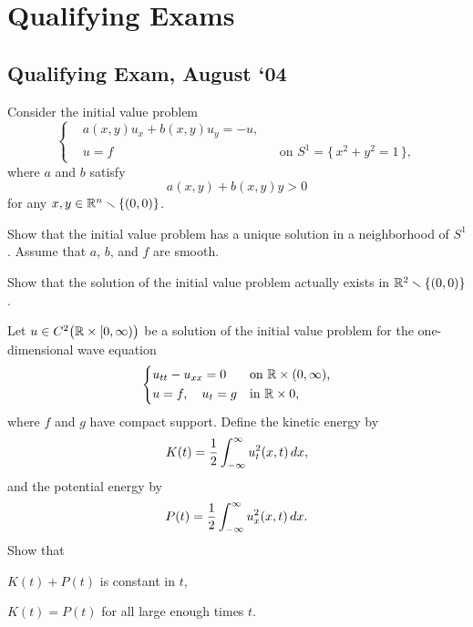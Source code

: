 \section{Qualifying Exams}
\subsection{Qualifying Exam, August `04}
\begin{problem}
  Consider the initial value problem
  \[
    \left\{
      \begin{aligned}
        &a(x,y)u_x+b(x,y)u_y=-u,\\
        &u=f&&\text{on \(S^1=\bigl\{\,x^2+y^2=1\,\bigr\}\)},
      \end{aligned}
    \right.
  \]
  where \(a\) and \(b\) satisfy
  \[
    a(x,y)+b(x,y)y>0
  \]
  for any \(x,y\in\mathbb{R}^n\smallsetminus\{(0,0)\}\).
  \begin{alphlist}
  \item Show that the initial value problem has a unique solution in a
    neighborhood of \(S^1\). Assume that \(a\), \(b\), and \(f\) are
    smooth.
  \item Show that the solution of the initial value problem actually
    exists in \(\mathbb{R}^2\smallsetminus\{(0,0)\}\).
  \end{alphlist}
\end{problem}
\begin{solution*}
\end{solution*}

\begin{problem}
  Let \(u\in C^2\bigl(\mathbb{R}\times[0,\infty)\bigr)\) be a solution of the
  initial value problem for the one-dimensional wave equation
  \[
    \left\{
      \begin{aligned}
        &u_{tt}-u_{xx}=0&&\text{on \(\mathbb{R}\times(0,\infty)\),}\\
        &u=f,\quad u_t=g&&\text{in \(\mathbb{R}\times 0\),}
      \end{aligned}
    \right.
  \]
  where \(f\) and \(g\) have compact support. Define the kinetic energy by
  \[
    K(t)=\frac{1}{2}\int_{-\infty}^\infty u_t^2(x,t)\mathop{}\!d x,
  \]
  and the potential energy by
  \[
    P(t)=\frac{1}{2}\int_{-\infty}^\infty u_x^2(x,t)\mathop{}\!d x.
  \]
  Show that
  \begin{alphlist}
  \item \(K(t)+P(t)\) is constant in \(t\),
  \item \(K(t)=P(t)\) for all large enough times \(t\).
  \end{alphlist}
\end{problem}
\begin{solution*}
\end{solution*}

